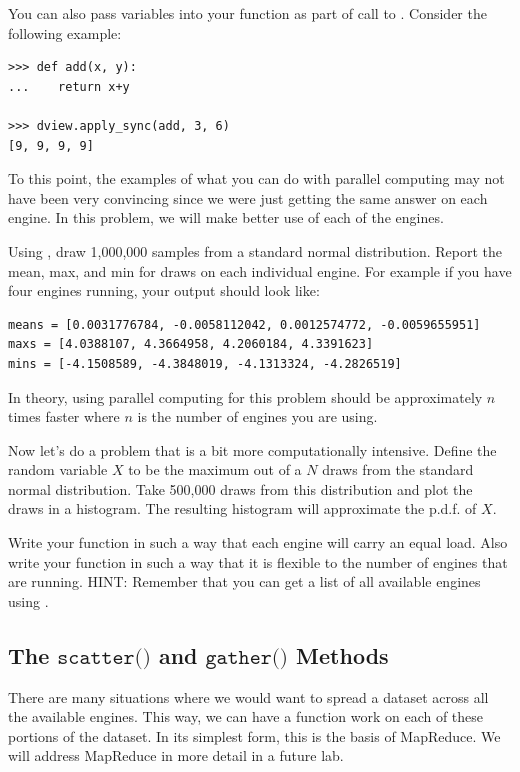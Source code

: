 You can also pass variables into your function as part of call to . Consider the following example:

\begin{lstlisting}
>>> def add(x, y):
...    return x+y

>>> dview.apply_sync(add, 3, 6)
[9, 9, 9, 9]
\end{lstlisting}

\begin{problem}
To this point, the examples of what you can do with parallel computing may not have been very convincing since we were just getting the same answer on each engine. In this problem, we will make better use of each of the engines.

Using , draw 1,000,000 samples from a standard normal distribution. Report the mean, max, and min for draws on each individual engine. For example if you have four engines running, your output should look like:
\begin{lstlisting}
means = [0.0031776784, -0.0058112042, 0.0012574772, -0.0059655951]
maxs = [4.0388107, 4.3664958, 4.2060184, 4.3391623]
mins = [-4.1508589, -4.3848019, -4.1313324, -4.2826519]
\end{lstlisting}

In theory, using parallel computing for this problem should be approximately $n$ times faster where $n$ is the number of engines you are using.
\end{problem}

\begin{problem}
Now let's do a problem that is a bit more computationally intensive. Define the random variable $X$ to be the maximum out of a $N$ draws from the standard normal distribution. Take 500,000 draws from this distribution and plot the draws in a histogram. The resulting histogram will approximate the p.d.f. of $X$.

Write your function in such a way that each engine will carry an equal load. Also write your function in such a way that it is flexible to the number of engines that are running. HINT: Remember that you can get a list of all available engines using .
\end{problem}

\subsection*{The $\texttt{scatter()}$ and $\texttt{gather()}$ Methods}
There are many situations where we would want to spread a dataset across all the available engines. This way, we can have a function work on each of these portions of the dataset. In its simplest form, this is the basis of MapReduce. We will address MapReduce in more detail in a future lab.

